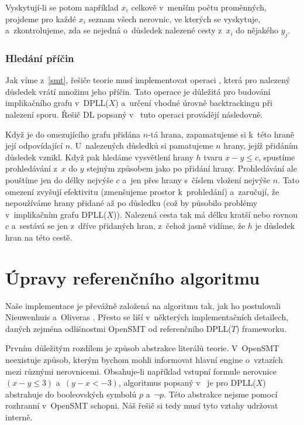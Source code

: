 Vyskytují-li se potom například $x_i$ celkově v~menším počtu proměnných, projdeme pro každé $x_i$ seznam všech nerovnic, ve kterých se vyskytuje, a~zkontrolujeme, zda se nejedná o~důsledek nalezené cesty z~$x_i$ do nějakého $y_j$.

\subsubsection*{Hledání příčin}

Jak víme z~\ref{smt}, řešiče teorie musí implementovat operaci , která pro nalezený důsledek vrátí množinu jeho příčin. Tato operace je důležitá pro budování implikačního grafu v~DPLL($X$) a~určení vhodné úrovně backtrackingu při nalezení sporu. Řešič DL popsaný v~\cite{Nieuwenhuis05} tuto operaci provádějí následovně.

Když je do omezujícího grafu přidána $n$-tá hrana, zapamatujeme si k~této hraně její odpovídající $n$. U~nalezených důsledků si pamatujeme $n$ hrany, jejíž přidáním důsledek vznikl. Když pak hledáme vysvětlení hrany $h$ tvaru $x-y \leq c$, spustíme prohledávání z~$x$ do $y$ stejným způsobem jako po přidání hrany. Prohledávání ale pouštíme jen do délky nejvýše $c$ a~jen přes hrany s~číslem vložení nejvýše $n$. Tato omezení zvyšují efektivitu (zmenšujeme prostor k~prohledání) a~zaručují, že nepoužíváme hrany přidané až po důsledku (což by působilo problémy v~implikačním grafu DPLL($X$)). Nalezená cesta tak má délku kratší nebo rovnou $c$ a~sestává se jen z~dříve přidaných hran, z~čehož jasně vidíme, že $h$ je důsledek hran na této cestě.

\section{Úpravy referenčního algoritmu}\label{upravy}

Naše implementace je převážně založená na algoritmu tak, jak ho postulovali Nieuwenhuis a~Oliveras \cite{Nieuwenhuis05}. Přesto se liší v~některých implementačních detailech, daných zejména odlišnostmi OpenSMT od referenčního DPLL($T$) frameworku. %

Prvním důležitým rozdílem je způsob abstrakce literálů teorie. V~OpenSMT neexistuje způsob, kterým bychom mohli informovat hlavní engine o~vztazích mezi různými nerovnicemi. Obsahuje-li například vstupní formule nerovnice $(x-y\leq 3)$ a~$(y-x<-3)$, algoritmus popsaný v~\cite{Nieuwenhuis05} je pro DPLL($X$) abstrahuje do booleovských symbolů $p$ a~$\neg p$. Této abstrakce nejsme pomocí rozhranní v~OpenSMT schopni. Náš řešič si tedy musí tyto vztahy udržovat interně. 

